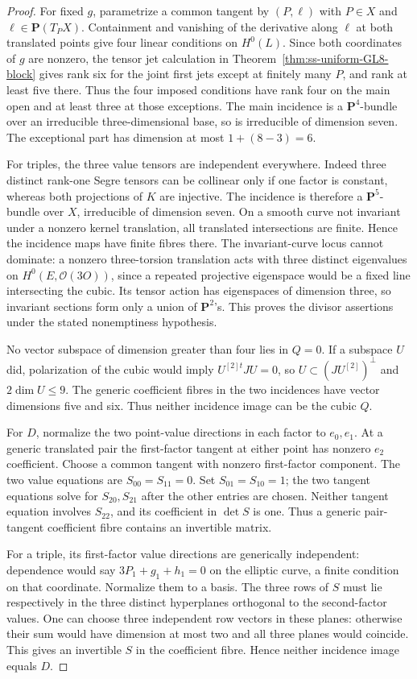 \begin{proof}
For fixed $g$, parametrize a common tangent by $(P,\ell)$ with
$P\in X$ and $\ell\in\mathbf P(T_PX)$. Containment and vanishing
of the derivative along $\ell$ at both translated points give four
linear conditions on $H^0(L)$. Since both coordinates of $g$ are
nonzero, the tensor jet calculation in
Theorem~\ref{thm:ss-uniform-GL8-block} gives rank six for the joint
first jets except at finitely many $P$, and rank at least five there.
Thus the four imposed conditions have rank four on the main open
and at least three at those exceptions. The main incidence is a
$\mathbf P^4$-bundle over an irreducible three-dimensional base,
so is irreducible of dimension seven. The exceptional part has
dimension at most $1+(8-3)=6$.

For triples, the three value tensors are independent everywhere.
Indeed three distinct rank-one Segre tensors can be collinear only
if one factor is constant, whereas both projections of $K$ are
injective. The incidence is therefore a $\mathbf P^5$-bundle over
$X$, irreducible of dimension seven.
On a smooth curve not invariant under a nonzero kernel translation,
all translated intersections are finite. Hence the incidence maps
have finite fibres there. The invariant-curve locus cannot dominate:
a nonzero three-torsion translation acts with three distinct eigenvalues
on $H^0(E,\mathcal O(3O))$, since a repeated projective eigenspace
would be a fixed line intersecting the cubic. Its tensor action has
eigenspaces of dimension three, so invariant sections form only a
union of $\mathbf P^2$'s. This proves the divisor assertions under
the stated nonemptiness hypothesis.

No vector subspace of dimension greater than four lies in $Q=0$.
If a subspace $U$ did, polarization of the cubic would imply
$U^{[2]t}JU=0$, so $U\subset(JU^{[2]})^\perp$ and
$2\dim U\le9$. The generic coefficient fibres in the two incidences
have vector dimensions five and six. Thus neither incidence image
can be the cubic $Q$.

For $D$, normalize the two point-value directions in each factor to
$e_0,e_1$. At a generic translated pair the first-factor tangent at
either point has nonzero $e_2$ coefficient. Choose a common tangent
with nonzero first-factor component. The two value equations are
$S_{00}=S_{11}=0$. Set $S_{01}=S_{10}=1$; the two tangent equations
solve for $S_{20},S_{21}$ after the other entries are chosen.
Neither tangent equation involves $S_{22}$, and its coefficient
in $\det S$ is one. Thus a generic pair-tangent coefficient fibre
contains an invertible matrix.

For a triple, its first-factor value directions are generically
independent: dependence would say $3P_1+g_1+h_1=0$ on the elliptic
curve, a finite condition on that coordinate. Normalize them to a
basis. The three rows of $S$ must lie respectively in the three
distinct hyperplanes orthogonal to the second-factor values.
One can choose three independent row vectors in these planes:
otherwise their sum would have dimension at most two and all
three planes would coincide. This gives an invertible $S$ in the
coefficient fibre. Hence neither incidence image equals $D$.
\end{proof}

